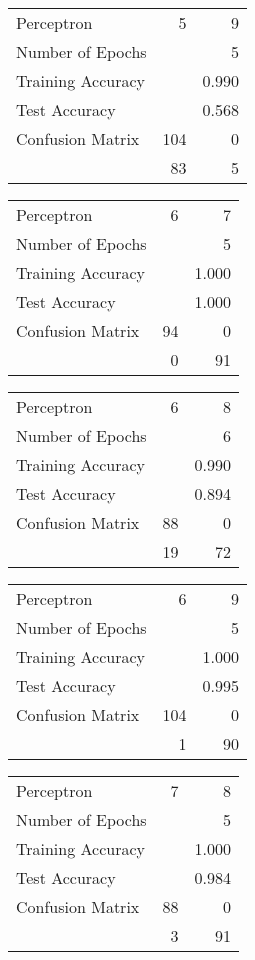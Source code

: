 \documentclass[11pt]{article}
\begin{document}
\begin{minipage}[t]{0.5\textwidth}
\begin{tabular}{|l | r r|}
\hline Perceptron & 5 & 9\\
Number of Epochs & & 5\\
Training Accuracy & & 0.990\\
Test Accuracy & & 0.568\\
Confusion Matrix & 104 & 0\\
 &83 & 5\\ \hline
\end{tabular}
\end{minipage}
\begin{minipage}[t]{0.5\textwidth}
\begin{tabular}{|l | r r|}
\hline Perceptron & 6 & 7\\
Number of Epochs & & 5\\
Training Accuracy & & 1.000\\
Test Accuracy & & 1.000\\
Confusion Matrix & 94 & 0\\
 &0 & 91\\ \hline
\end{tabular}
\end{minipage}
\begin{minipage}[t]{0.5\textwidth}
\begin{tabular}{|l | r r|}
\hline Perceptron & 6 & 8\\
Number of Epochs & & 6\\
Training Accuracy & & 0.990\\
Test Accuracy & & 0.894\\
Confusion Matrix & 88 & 0\\
 &19 & 72\\ \hline
\end{tabular}
\end{minipage}
\begin{minipage}[t]{0.5\textwidth}
\begin{tabular}{|l | r r|}
\hline Perceptron & 6 & 9\\
Number of Epochs & & 5\\
Training Accuracy & & 1.000\\
Test Accuracy & & 0.995\\
Confusion Matrix & 104 & 0\\
 &1 & 90\\ \hline
\end{tabular}
\end{minipage}
\begin{minipage}[t]{0.5\textwidth}
\begin{tabular}{|l | r r|}
\hline Perceptron & 7 & 8\\
Number of Epochs & & 5\\
Training Accuracy & & 1.000\\
Test Accuracy & & 0.984\\
Confusion Matrix & 88 & 0\\
 &3 & 91\\ \hline
\end{tabular}
\end{minipage}
\end{document}
